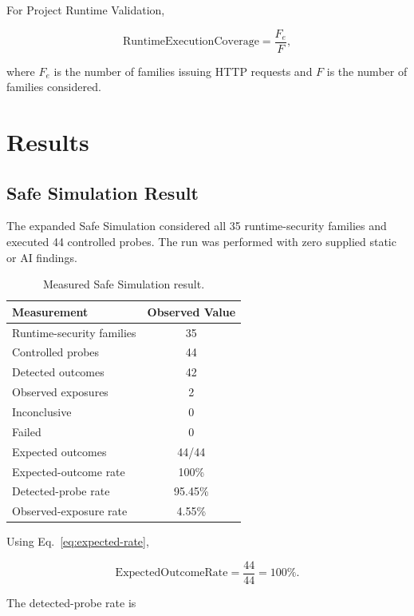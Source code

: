 \documentclass[journal]{IEEEtran}
\begin{document}
For Project Runtime Validation,

\begin{equation}
\mathrm{RuntimeExecutionCoverage}
=
\frac{F_e}{F},
\label{eq:runtime-coverage}
\end{equation}

where $F_e$ is the number of families issuing HTTP requests and $F$ is the
number of families considered.

\section{Results}

\subsection{Safe Simulation Result}

The expanded Safe Simulation considered all 35 runtime-security families and
executed 44 controlled probes. The run was performed with zero supplied
static or AI findings.

\begin{table}[!t]
\centering
\caption{Measured Safe Simulation result.}
\label{tab:safe-results}
\begin{tabular}{lc}
\toprule
\textbf{Measurement} & \textbf{Observed Value} \\
\midrule
Runtime-security families & 35 \\
Controlled probes & 44 \\
Detected outcomes & 42 \\
Observed exposures & 2 \\
Inconclusive & 0 \\
Failed & 0 \\
Expected outcomes & 44/44 \\
Expected-outcome rate & 100\% \\
Detected-probe rate & 95.45\% \\
Observed-exposure rate & 4.55\% \\
\bottomrule
\end{tabular}
\end{table}

Using Eq.~\eqref{eq:expected-rate},

\begin{equation}
\mathrm{ExpectedOutcomeRate}
=
\frac{44}{44}
=
100\%.
\end{equation}

The detected-probe rate is
\end{document}

